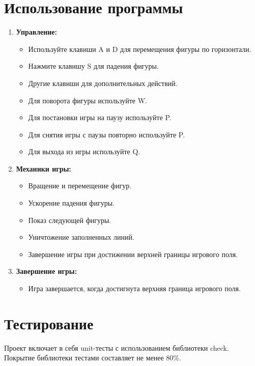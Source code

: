 \documentclass{article}
\begin{document}
\section{Использование программы}

\begin{enumerate}
    \item \textbf{Управление:}
        \begin{itemize}
            \item Используйте клавиши A и D для перемещения фигуры по горизонтали.
            \item Нажмите клавишу S для падения фигуры.
            \item Другие клавиши для дополнительных действий.
            \item Для поворота фигуры используйте W.
            \item Для постановки игры на паузу используйте P.
            \item Для снятия игры с паузы повторно используйте P.
            \item Для выхода из игры используйте Q.
        \end{itemize}
    \item \textbf{Механики игры:}
        \begin{itemize}
            \item Вращение и перемещение фигур.
            \item Ускорение падения фигуры.
            \item Показ следующей фигуры.
            \item Уничтожение заполненных линий.
            \item Завершение игры при достижении верхней границы игрового поля.
        \end{itemize}
    \item \textbf{Завершение игры:}
        \begin{itemize}
            \item Игра завершается, когда достигнута верхняя граница игрового поля.
        \end{itemize}
\end{enumerate}

\section{Тестирование}

Проект включает в себя unit-тесты с использованием библиотеки check. Покрытие библиотеки тестами составляет не менее 80\%.
\end{document}
